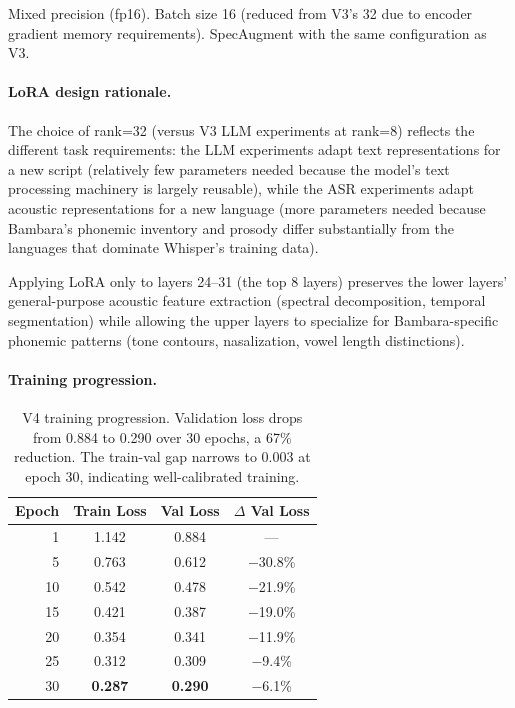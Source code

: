 \documentclass[11pt]{article}
\begin{document}
Mixed precision (fp16).
Batch size 16 (reduced from V3's 32 due to encoder gradient memory requirements).
SpecAugment with the same configuration as V3.

\paragraph{LoRA design rationale.}
The choice of rank=32 (versus V3 LLM experiments at rank=8) reflects the different task requirements: the LLM experiments adapt text representations for a new script (relatively few parameters needed because the model's text processing machinery is largely reusable), while the ASR experiments adapt acoustic representations for a new language (more parameters needed because Bambara's phonemic inventory and prosody differ substantially from the languages that dominate Whisper's training data).

Applying LoRA only to layers 24--31 (the top 8 layers) preserves the lower layers' general-purpose acoustic feature extraction (spectral decomposition, temporal segmentation) while allowing the upper layers to specialize for Bambara-specific phonemic patterns (tone contours, nasalization, vowel length distinctions).

\paragraph{Training progression.}

\begin{table}[t]
\centering
\small
\begin{tabular}{rccc}
\toprule
\textbf{Epoch} & \textbf{Train Loss} & \textbf{Val Loss} & \textbf{$\Delta$ Val Loss} \\
\midrule
1 & 1.142 & 0.884 & --- \\
5 & 0.763 & 0.612 & $-$30.8\% \\
10 & 0.542 & 0.478 & $-$21.9\% \\
15 & 0.421 & 0.387 & $-$19.0\% \\
20 & 0.354 & 0.341 & $-$11.9\% \\
25 & 0.312 & 0.309 & $-$9.4\% \\
30 & \textbf{0.287} & \textbf{0.290} & $-$6.1\% \\
\bottomrule
\end{tabular}
\caption{V4 training progression. Validation loss drops from 0.884 to 0.290 over 30 epochs, a 67\% reduction. The train-val gap narrows to 0.003 at epoch 30, indicating well-calibrated training.}
\label{tab:v4-training}
\end{table}
\end{document}
